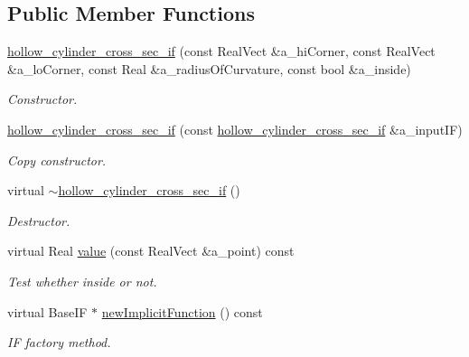 \subsection*{Public Member Functions}
\begin{DoxyCompactItemize}
\item 
\hyperlink{classhollow__cylinder__cross__sec__if_a427059402673eb18f5c7c2cadf3b9258}{hollow\+\_\+cylinder\+\_\+cross\+\_\+sec\+\_\+if} (const Real\+Vect \&a\+\_\+hi\+Corner, const Real\+Vect \&a\+\_\+lo\+Corner, const Real \&a\+\_\+radius\+Of\+Curvature, const bool \&a\+\_\+inside)
\begin{DoxyCompactList}\small\item\em Constructor. \end{DoxyCompactList}\item 
\hyperlink{classhollow__cylinder__cross__sec__if_a1148ccfc2300d87ac7a9ad243a514001}{hollow\+\_\+cylinder\+\_\+cross\+\_\+sec\+\_\+if} (const \hyperlink{classhollow__cylinder__cross__sec__if}{hollow\+\_\+cylinder\+\_\+cross\+\_\+sec\+\_\+if} \&a\+\_\+input\+IF)
\begin{DoxyCompactList}\small\item\em Copy constructor. \end{DoxyCompactList}\item 
virtual \hyperlink{classhollow__cylinder__cross__sec__if_a41e7cf00eeb56e36f7dbddb530473157}{$\sim$hollow\+\_\+cylinder\+\_\+cross\+\_\+sec\+\_\+if} ()
\begin{DoxyCompactList}\small\item\em Destructor. \end{DoxyCompactList}\item 
virtual Real \hyperlink{classhollow__cylinder__cross__sec__if_a704bfbc9b2674118502b719fb553ac68}{value} (const Real\+Vect \&a\+\_\+point) const 
\begin{DoxyCompactList}\small\item\em Test whether inside or not. \end{DoxyCompactList}\item 
virtual Base\+IF $\ast$ \hyperlink{classhollow__cylinder__cross__sec__if_af3b1c7934c249b89b1db3bca83299aaa}{new\+Implicit\+Function} () const 
\begin{DoxyCompactList}\small\item\em IF factory method. \end{DoxyCompactList}\end{DoxyCompactItemize}
